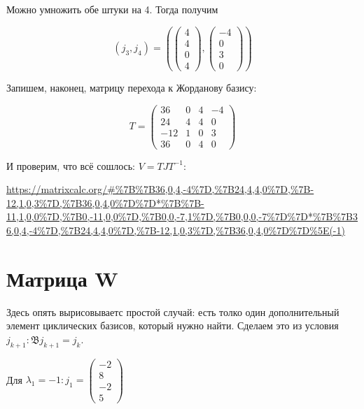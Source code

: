 \documentclass[12pt, a4paper]{article}
\begin{document}
    Можно умножить обе штуки на 4. Тогда получим 

    \begin{equation}
        (j_3, j_4) = \left( \left(\begin{matrix}
            4 \\ 4 \\ 0 \\ 4
        \end{matrix}\right), \left(\begin{matrix}
            -4 \\
            0 \\
            3 \\
            0
        \end{matrix}\right) \right)
    \end{equation}


    Запишем, наконец, матрицу перехода к Жорданову базису:

    \begin{equation}
        T = \left(\begin{matrix}
            36 & 0 & 4 & -4 \\
            24 & 4 & 4 & 0 \\
            -12 & 1 & 0 & 3 \\
            36 & 0 & 4 & 0
        \end{matrix}\right)
    \end{equation}

    И проверим, что всё сошлось: $V = T J T^{-1}$:

    \url{https://matrixcalc.org/#%7B%7B36,0,4,-4%7D,%7B24,4,4,0%7D,%7B-12,1,0,3%7D,%7B36,0,4,0%7D%7D*%7B%7B-11,1,0,0%7D,%7B0,-11,0,0%7D,%7B0,0,-7,1%7D,%7B0,0,0,-7%7D%7D*%7B%7B36,0,4,-4%7D,%7B24,4,4,0%7D,%7B-12,1,0,3%7D,%7B36,0,4,0%7D%7D%5E(-1)}

    \section{Матрица W}
    
    Здесь опять вырисовываетс простой случай: есть толко один дополнительный элемент циклических базисов, который нужно найти.
    Сделаем это из условия $j_{k + 1}: \mathfrak{B} j_{k + 1} = j_{k}$.

    Для $\lambda_1 = -1: j_1 = \begin{pmatrix}
        -2 \\ 8 \\ -2 \\ 5
    \end{pmatrix}$
\end{document}
